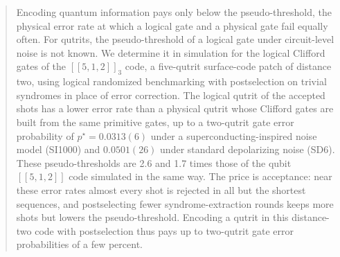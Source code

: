 \documentclass[aps,prxquantum,reprint,superscriptaddress,amsmath,amssymb,floatfix]{revtex4-2}
\begin{document}
\begin{abstract}
Encoding quantum information pays only below the pseudo-threshold, the physical error rate at which a logical gate and a physical gate fail equally often. For qutrits, the pseudo-threshold of a logical gate under circuit-level noise is not known. We determine it in simulation for the logical Clifford gates of the $[[5,1,2]]_3$ code, a five-qutrit surface-code patch of distance two, using logical randomized benchmarking with postselection on trivial syndromes in place of error correction. The logical qutrit of the accepted shots has a lower error rate than a physical qutrit whose Clifford gates are built from the same primitive gates, up to a two-qutrit gate error probability of $p^\star = 0.0313(6)$ under a superconducting-inspired noise model (SI1000) and $0.0501(26)$ under standard depolarizing noise (SD6). These pseudo-thresholds are 2.6 and 1.7 times those of the qubit $[[5,1,2]]$ code simulated in the same way. The price is acceptance: near these error rates almost every shot is rejected in all but the shortest sequences, and postselecting fewer syndrome-extraction rounds keeps more shots but lowers the pseudo-threshold. Encoding a qutrit in this distance-two code with postselection thus pays up to two-qutrit gate error probabilities of a few percent.
\end{abstract}
\maketitle
\end{document}
